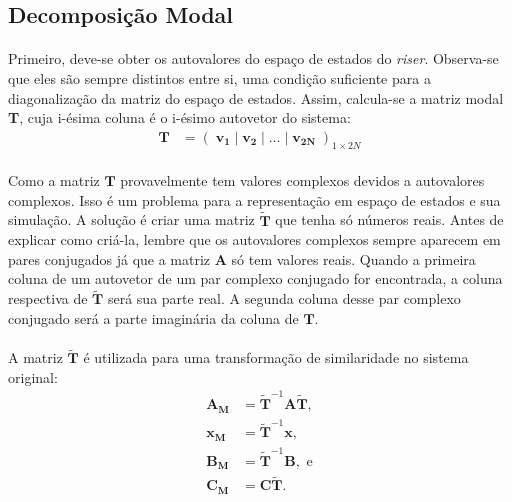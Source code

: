 \documentclass[a4paper,11pt]{scrartcl} %
\numberwithin{equation}{section} %
\numberwithin{figure}{section} %
\numberwithin{table}{section} %
\begin{document}
\subsection{Decomposição Modal}

\paragraph{} Primeiro, deve-se obter os autovalores do espaço de estados do \textit{riser}. Observa-se que eles são sempre distintos entre si, uma condição suficiente para a diagonalização da matriz do espaço de estados. Assim, calcula-se a matriz modal \textbf{T}, cuja i-ésima coluna é o i-ésimo autovetor do sistema: \begin{align}
	\mathbf{T} &= \left(\;\mathbf{v_1}\;|\;\mathbf{v_2}\;|\;\ldots\;|\;\mathbf{v_{2N}}\;\right)_{1\times 2N}
\end{align}

\paragraph{} Como a matriz $\mathbf{T}$ provavelmente tem valores complexos devidos a autovalores complexos. Isso é um problema para a representação em espaço de estados e sua simulação. A solução é criar uma matriz $\mathbf{\tilde{T}}$ que tenha só números reais. Antes de explicar como criá-la, lembre que os autovalores complexos sempre aparecem em pares conjugados já que a matriz $\mathbf{A}$ só tem valores reais. Quando a primeira coluna de um autovetor de um par complexo conjugado for encontrada, a coluna respectiva de $\mathbf{\tilde{T}}$ será sua parte real. A segunda coluna desse par complexo conjugado será a parte imaginária da coluna de $\mathbf{T}$.

\paragraph{} A matriz $\mathbf{\tilde{T}}$ é utilizada para uma transformação de similaridade no sistema original: \begin{align}
	\mathbf{A_M} &= \mathbf{\tilde{T}}^{-1}\mathbf{A}\mathbf{\tilde{T}},\\
	\mathbf{x_M} &=\mathbf{\tilde{T}}^{-1}\mathbf{x},	\\
	\mathbf{B_M} &= \mathbf{\tilde{T}}^{-1}\mathbf{B},\textrm{ e}\\
	\mathbf{C_M} &=\mathbf{C}\mathbf{\tilde{T}}.
\end{align}
\end{document}
